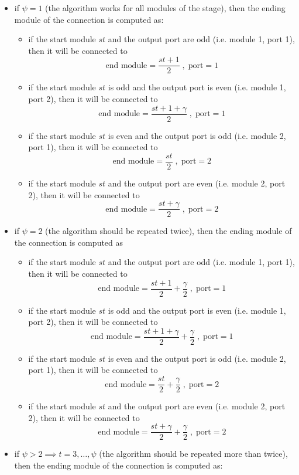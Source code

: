 \documentclass{ltxdoc}
\begin{document}
\begin{itemize}
\item if $\psi=1$ (the algorithm works for all modules of the stage), then the ending module of the connection is computed as:
\begin{itemize}
\item if the start module $st$ and the output port are odd (i.e. module 1, port 1), then it will be connected to  
\[\textrm{end module}=\dfrac{st+1}{2} \; , \; \textrm{port}=1 \]
\item if the start module $st$ is odd and the output port is even (i.e. module 1, port 2), then it will be connected to  
\[\textrm{end module}=\dfrac{st+1+\gamma}{2}\; , \; \textrm{port}=1 \]
\item if the start module $st$ is even and the output port is odd (i.e. module 2, port 1), then it will be connected to  
\[\textrm{end module}=\dfrac{st}{2}  \; , \; \textrm{port}=2 \]
\item if the start module $st$ and the output port are even (i.e. module 2, port 2), then it will be connected to  
\[\textrm{end module}=\dfrac{st+\gamma}{2}\; , \; \textrm{port}=2 \]
\end{itemize}
\item if $\psi=2$ (the algorithm should be repeated twice), then the ending module of the connection is computed as
\begin{itemize}
\item if the start module $st$ and the output port are odd (i.e. module 1, port 1), then it will be connected to  
\[\textrm{end module}=\dfrac{st+1}{2}+\dfrac{\gamma}{2} \; , \; \textrm{port}=1 \]
\item if the start module $st$ is odd and the output port is even (i.e. module 1, port 2), then it will be connected to  
\[\textrm{end module}=\dfrac{st+1+\gamma}{2}+\dfrac{\gamma}{2}\; , \; \textrm{port}=1 \]
\item if the start module $st$ is even and the output port is odd (i.e. module 2, port 1), then it will be connected to  
\[\textrm{end module}=\dfrac{st}{2}+\dfrac{\gamma}{2}  \; , \; \textrm{port}=2 \]
\item if the start module $st$ and the output port are even (i.e. module 2, port 2), then it will be connected to  
\[\textrm{end module}=\dfrac{st+\gamma}{2}+\dfrac{\gamma}{2}\; , \; \textrm{port}=2 \]
\end{itemize}
\item if $\psi>2\implies t=3,\ldots, \psi$ (the algorithm should be repeated more than twice), then the ending module of the connection is computed as:

\end{itemize}
\end{document}
